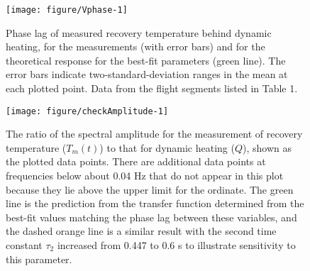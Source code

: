 \documentclass[11pt,twoside,american,12pt,twoside,american]{article}\usepackage[]{graphicx}\usepackage[]{color}
\makeatletter
\def\maxwidth{ %
  \ifdim\Gin@nat@width>\linewidth
    \linewidth
  \else
    \Gin@nat@width
  \fi
}
\newenvironment{knitrout}{}{} %
\makeatother
\begin{document}
\begin{knitrout}
\color{fgcolor}\begin{figure}

{\centering \texttt{[image: figure/Vphase-1]} 

}

\caption[Phase lag of measured recovery temperature behind dynamic heating, for the measurements (with error bars) and for the theoretical response for the best-fit parameters (green line)]{Phase lag of measured recovery temperature behind dynamic heating, for the measurements (with error bars) and for the theoretical response for the best-fit parameters (green line). The error bars indicate two-standard-deviation ranges in the mean at each plotted point. Data from the  flight segments listed in Table 1.}\label{fig:Vphase}
\end{figure}


\end{knitrout}

\begin{knitrout}
\color{fgcolor}\begin{figure}[t]

{\centering \texttt{[image: figure/checkAmplitude-1]} 

}

\caption[The ratio of the spectral amplitude for the measurement of recovery temperature ($T_m(t)$) to that for dynamic heating ($Q$), shown as the plotted data points]{The ratio of the spectral amplitude for the measurement of recovery temperature ($T_m(t)$) to that for dynamic heating ($Q$), shown as the plotted data points. There are additional data points at frequencies below about 0.04 Hz that do not appear in this plot because they lie above the upper limit for the ordinate. The green line is the prediction from the transfer function determined from the best-fit values matching the phase lag between these variables, and the dashed orange line is a similar result with the second time constant $\tau_2$ increased from 0.447 to 0.6 s to illustrate sensitivity to this parameter.}\label{fig:checkAmplitude}
\end{figure}


\end{knitrout}
\end{document}
